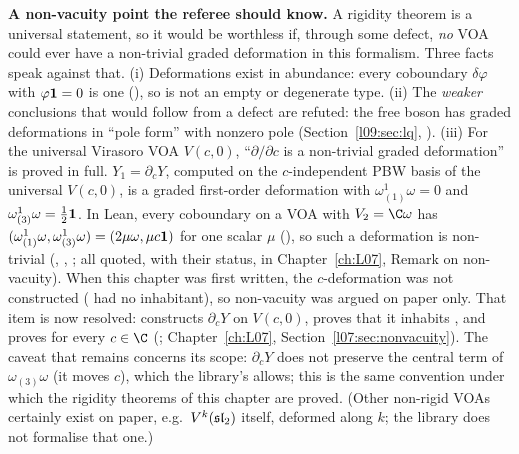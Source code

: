 \begin{warning}
\textbf{A non-vacuity point the referee should know.} A rigidity theorem is a universal statement,
so it would be worthless if, through some defect, \emph{no} VOA could ever have a non-trivial graded
deformation in this formalism. Three facts speak against that. (i) Deformations exist in abundance:
every coboundary $\delta\varphi$ with $\varphi\mathbf{1}=0$ is one (), so
 is not an empty or degenerate type. (ii) The \emph{weaker}
conclusions that would follow from a defect are refuted: the free boson has graded deformations in
``pole form'' with nonzero pole (Section~\ref{l09:sec:lq}, ).
(iii) For the universal Virasoro VOA $V(c,0)$, ``$\partial/\partial c$ is a non-trivial graded deformation'' is
proved in full. $Y_1 = \partial_cY$, computed on the $c$-independent PBW basis of the universal $V(c,0)$, is a
graded first-order deformation with $\omega^1_{(1)}\omega = 0$ and $\omega^1_{(3)}\omega = \frac12\mathbf{1}$. In
Lean, every coboundary on a VOA with $V_2 = \C\omega$ has $(\omega^1_{(1)}\omega,\omega^1_{(3)}\omega) =
(2\mu\omega,\mu c\mathbf{1})$ for one scalar $\mu$ (), so such a
deformation is non-trivial (,
,
; all quoted, with their status, in
Chapter~\ref{ch:L07}, Remark on non-vacuity).
When this chapter was first written, the $c$-deformation was not constructed
( had no inhabitant), so non-vacuity was argued on paper only. That item is now resolved:
\allowbreak{}\allowbreak{} constructs $\partial_cY$ on $V(c,0)$,
\allowbreak{}\allowbreak{}\allowbreak{} proves that it inhabits
, and \allowbreak{}\allowbreak{}\allowbreak{}\allowbreak{} proves
 for every $c\in\C$
(; Chapter~\ref{ch:L07},
Section~\ref{l07:sec:nonvacuity}). The caveat that remains concerns its scope: $\partial_cY$ does not preserve the central
term of $\omega_{(3)}\omega$ (it moves $c$), which the library's  allows; this is the same
convention under which the rigidity theorems of this chapter are proved. (Other non-rigid VOAs certainly exist on paper,
e.g.\ $V^k(\mathfrak{sl}_2)$ itself, deformed along $k$; the library does not formalise that one.)
\end{warning}

